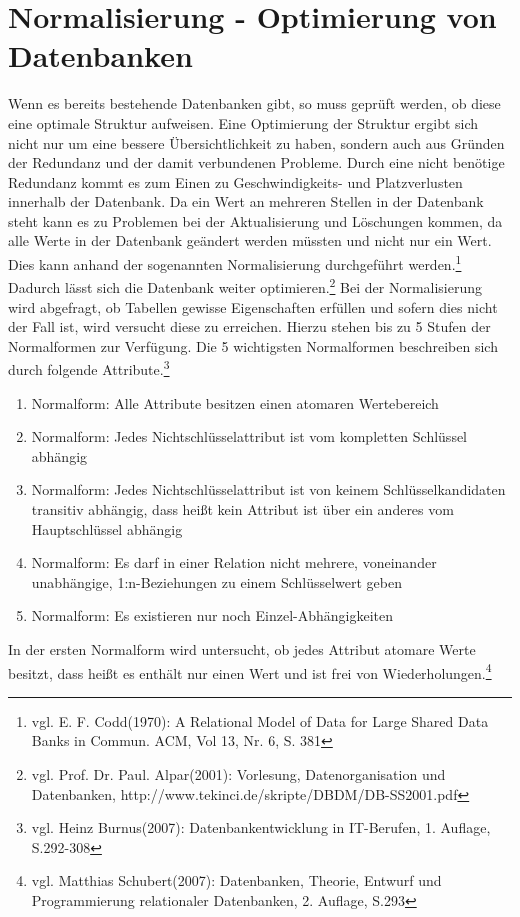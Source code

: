\section{Normalisierung - Optimierung von Datenbanken}
\label{secNormalisierung}
Wenn es bereits bestehende Datenbanken gibt, so muss geprüft werden, ob diese eine optimale Struktur aufweisen.
Eine Optimierung der Struktur ergibt sich nicht nur um eine bessere Übersichtlichkeit zu haben, sondern auch aus Gründen der Redundanz und der damit verbundenen Probleme.
Durch eine nicht benötige Redundanz kommt es zum Einen zu Geschwindigkeits- und Platzverlusten innerhalb der Datenbank.
Da ein Wert an mehreren Stellen in der Datenbank steht kann es zu Problemen bei der Aktualisierung und Löschungen kommen, da alle Werte in der Datenbank geändert werden müssten und nicht nur ein Wert.
Dies kann anhand der sogenannten Normalisierung durchgeführt werden.\footnote{vgl. E. F. Codd(1970): A Relational Model of Data for Large Shared Data Banks in Commun. ACM, Vol 13, Nr. 6, S. 381} Dadurch lässt sich die Datenbank weiter optimieren.\footnote{vgl. Prof. Dr. Paul. Alpar(2001): Vorlesung, Datenorganisation und Datenbanken,  http://www.tekinci.de/skripte/DBDM/DB-SS2001.pdf}
Bei der Normalisierung wird abgefragt, ob Tabellen gewisse Eigenschaften erfüllen und sofern dies nicht der Fall ist, wird versucht diese zu erreichen.
Hierzu stehen bis zu 5 Stufen der Normalformen zur Verfügung.
Die 5 wichtigsten Normalformen beschreiben sich durch folgende Attribute.\footnote{vgl. Heinz Burnus(2007): Datenbankentwicklung in IT-Berufen, 1. Auflage, S.292-308}

\begin{enumerate}
\item Normalform: Alle Attribute besitzen einen atomaren Wertebereich
\item Normalform: Jedes Nichtschlüsselattribut ist vom kompletten Schlüssel abhängig
\item Normalform: Jedes Nichtschlüsselattribut ist von keinem Schlüsselkandidaten transitiv abhängig, dass heißt kein Attribut ist über ein anderes vom Hauptschlüssel abhängig
\item Normalform: Es darf in einer Relation nicht mehrere, voneinander unabhängige, 1:n-Beziehungen zu einem Schlüsselwert geben
\item Normalform: Es existieren nur noch Einzel-Abhängigkeiten
\end{enumerate}


In der ersten Normalform wird untersucht, ob jedes Attribut atomare Werte besitzt, dass heißt es enthält nur einen Wert und ist frei von Wiederholungen.\footnote{vgl. Matthias Schubert(2007): Datenbanken, Theorie, Entwurf und Programmierung relationaler Datenbanken, 2. Auflage, S.293}


